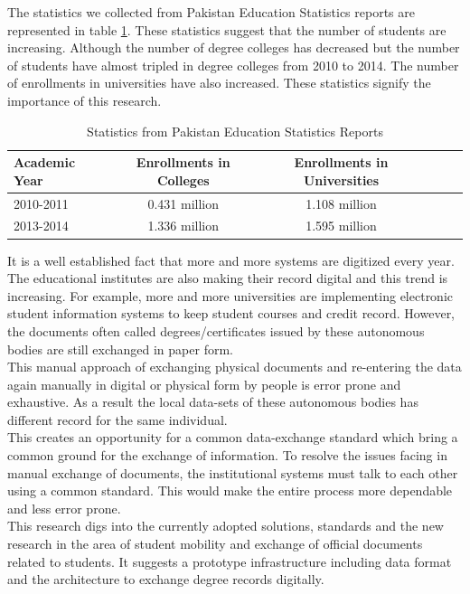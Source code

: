 \documentclass[12pt,a4paper,oneside]{book}
\begin{document}
The statistics we collected from Pakistan Education Statistics reports are represented in table \ref{tab:pakedustats}. These statistics suggest that the number of students are increasing. Although the number of degree colleges has decreased but the number of students have almost tripled in degree colleges from 2010 to 2014. The number of enrollments in universities have also increased. These statistics signify the importance of this research.

\begin{table}[!tbh]
\caption{Statistics from Pakistan Education Statistics Reports}
\label{tab:pakedustats}
\centering
\begin{tabular}[width=\columnwidth]{|p{1.3in}|c|c|c|c|c|}
\hline
Academic Year               	& Enrollments in Colleges		& Enrollments in Universities\\
\hline
2010-2011 	    	& 0.431 million					& 1.108 million \\
2013-2014	    	& 1.336 million 				& 1.595 million \\
\hline
\end{tabular}
\end{table}

It is a well established fact that more and more systems are digitized every year. The educational institutes are also making their record digital and this trend is increasing. For example, more and more universities are implementing electronic student information systems to keep student courses and credit record. However, the documents often called degrees/certificates issued by these autonomous bodies are still exchanged in paper form.  \\

This manual approach of exchanging physical documents and re-entering the data again manually in digital or physical form by people is error prone and exhaustive. As a result the local data-sets of these autonomous bodies has different record for the same individual. \\

This creates an opportunity for a common data-exchange standard which bring a common ground for the exchange of information. To resolve the issues facing in manual exchange of documents, the institutional systems must talk to each other using a common standard. This would make the entire process more dependable and less error prone. \\

This research digs into the currently adopted solutions, standards and the new research in the area of student mobility and exchange of official documents related to students. It suggests a prototype infrastructure including data format and the architecture to exchange degree records digitally. \\
\end{document}
